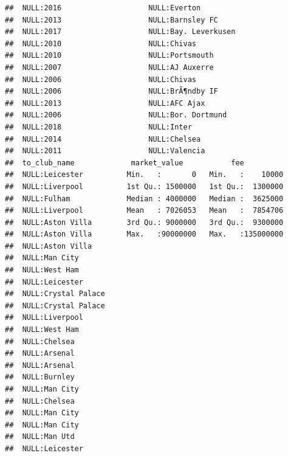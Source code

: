 \documentclass{article}\usepackage[]{graphicx}\usepackage[]{color}
\makeatletter
\newenvironment{kframe}{%
 \def\at@end@of@kframe{}%
 \ifinner\ifhmode%
  \def\at@end@of@kframe{\end{minipage}}%
  \begin{minipage}{\columnwidth}%
 \fi\fi%
 \def\FrameCommand##1{\hskip\@totalleftmargin \hskip-\fboxsep
 \colorbox{shadecolor}{##1}\hskip-\fboxsep
     \hskip-\linewidth \hskip-\@totalleftmargin \hskip\columnwidth}%
 \MakeFramed {\advance\hsize-\width
   \@totalleftmargin\z@ \linewidth\hsize
   \@setminipage}}%
 {\par\unskip\endMakeFramed%
 \at@end@of@kframe}
\newenvironment{knitrout}{}{} %
\makeatother
\begin{document}
\begin{knitrout}
\begin{kframe}
\begin{verbatim}
##  NULL:2016                    NULL:Everton                             
##  NULL:2013                    NULL:Barnsley FC                         
##  NULL:2017                    NULL:Bay. Leverkusen                     
##  NULL:2010                    NULL:Chivas                              
##  NULL:2010                    NULL:Portsmouth                          
##  NULL:2007                    NULL:AJ Auxerre                          
##  NULL:2006                    NULL:Chivas                              
##  NULL:2006                    NULL:BrÃ¶ndby IF                         
##  NULL:2013                    NULL:AFC Ajax                            
##  NULL:2006                    NULL:Bor. Dortmund                       
##  NULL:2018                    NULL:Inter                               
##  NULL:2014                    NULL:Chelsea                             
##  NULL:2011                    NULL:Valencia                            
##  to_club_name             market_value           fee           
##  NULL:Leicester          Min.   :       0   Min.   :    10000  
##  NULL:Liverpool          1st Qu.: 1500000   1st Qu.:  1300000  
##  NULL:Fulham             Median : 4000000   Median :  3625000  
##  NULL:Liverpool          Mean   : 7026053   Mean   :  7854706  
##  NULL:Aston Villa        3rd Qu.: 9000000   3rd Qu.:  9300000  
##  NULL:Aston Villa        Max.   :90000000   Max.   :135000000  
##  NULL:Aston Villa                                              
##  NULL:Man City                                                 
##  NULL:West Ham                                                 
##  NULL:Leicester                                                
##  NULL:Crystal Palace                                           
##  NULL:Crystal Palace                                           
##  NULL:Liverpool                                                
##  NULL:West Ham                                                 
##  NULL:Chelsea                                                  
##  NULL:Arsenal                                                  
##  NULL:Arsenal                                                  
##  NULL:Burnley                                                  
##  NULL:Man City                                                 
##  NULL:Chelsea                                                  
##  NULL:Man City                                                 
##  NULL:Man City                                                 
##  NULL:Man Utd                                                  
##  NULL:Leicester                                                

\end{verbatim}
\end{kframe}
\end{knitrout}
\end{document}
